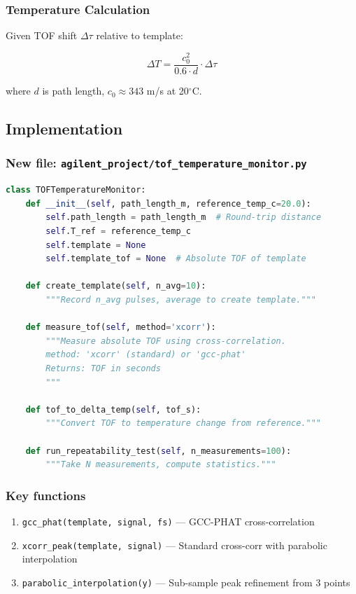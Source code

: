 \documentclass[11pt]{article}
\begin{document}
\subsubsection{Temperature Calculation}
Given TOF shift $\Delta\tau$ relative to template:

$$\Delta T = \frac{c_0^2}{0.6 \cdot d} \cdot \Delta\tau$$

where $d$ is path length, $c_0 \approx 343$ m/s at 20$^\circ$C.

\subsection{Implementation}

\subsubsection{New file: \texttt{agilent\_project/tof\_temperature\_monitor.py}}

\begin{lstlisting}[language=Python]
class TOFTemperatureMonitor:
    def __init__(self, path_length_m, reference_temp_c=20.0):
        self.path_length = path_length_m  # Round-trip distance
        self.T_ref = reference_temp_c
        self.template = None
        self.template_tof = None  # Absolute TOF of template

    def create_template(self, n_avg=10):
        """Record n_avg pulses, average to create template."""

    def measure_tof(self, method='xcorr'):
        """Measure absolute TOF using cross-correlation.
        method: 'xcorr' (standard) or 'gcc-phat'
        Returns: TOF in seconds
        """

    def tof_to_delta_temp(self, tof_s):
        """Convert TOF to temperature change from reference."""

    def run_repeatability_test(self, n_measurements=100):
        """Take N measurements, compute statistics."""
\end{lstlisting}

\subsubsection{Key functions}

\begin{enumerate}
    \item \texttt{gcc\_phat(template, signal, fs)} --- GCC-PHAT cross-correlation
    \item \texttt{xcorr\_peak(template, signal)} --- Standard cross-corr with parabolic interpolation
    \item \texttt{parabolic\_interpolation(y)} --- Sub-sample peak refinement from 3 points
\end{enumerate}
\end{document}
